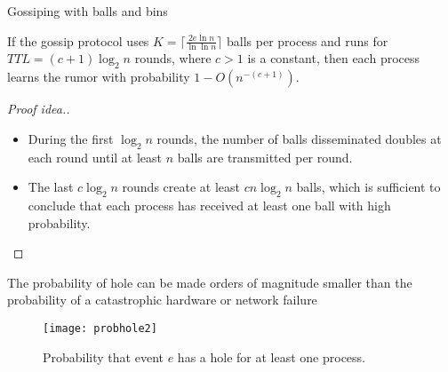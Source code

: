 \begin{frame}{Gossiping with balls and bins}

  \begin{snugshade}    
\begin{theorem}[Koldehofe 2002]
If the gossip protocol uses $K= \lceil \frac{2e \ln n}{\ln \ln n} \rceil$ balls per process and runs for $TTL = (c + 1) \log_2 n$ rounds, where $c > 1$ is a constant, then each process learns the rumor with probability $1 - O\left(n^{-(c+1)}\right)$.  
\end{theorem}
\end{snugshade}


\begin{proof}[Proof idea.]
  \begin{itemize}
  \item During the first $\log_2 n$ rounds, the number of balls disseminated doubles at each round until at least $n$ balls are transmitted per round. 

\item The last $c \log_2 n$ rounds create at least $c n \log_2 n$ balls, which is sufficient to conclude that each process has received at least one ball with high probability.
\end{itemize}
\end{proof}

\end{frame}


\begin{frame}{The probability of hole can be made orders of magnitude smaller than the probability of a catastrophic hardware or network failure}
  
\begin{figure}
  \centering
  \texttt{[image: probhole2]}
   \caption*{Probability that event $e$ has a hole for at least one process.}
 \end{figure}
 
\end{frame}


\subtitle[Architecture]{Architecture}


